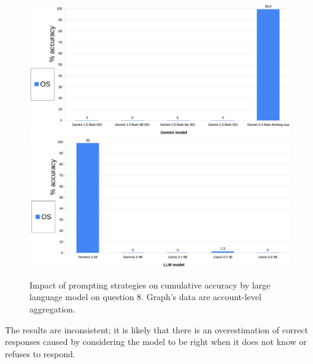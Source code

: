 \documentclass[12pt]{article}
\begin{document}
\vspace{2cm}


\begin{figure}[H]
    \centering
            \includegraphics[width=1\textwidth]{q202Gemini.png}
            \includegraphics[width=1\textwidth]{q202Other.png}
    \caption[Accuracy on Question 8 by LLM]{Impact of prompting strategies on cumulative accuracy by large language model on question 8. Graph's data are account-level aggregation.}
    \end{figure} 
The results are inconsistent; it is likely that there is an overestimation of correct responses caused by considering the model to be right when it does not know or refuses to respond.\\

\vspace{2cm}

\end{document}
